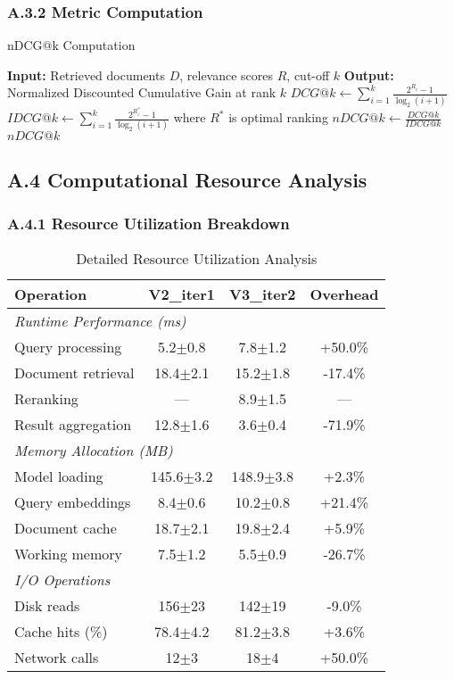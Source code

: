 \documentclass{article}
\begin{document}
\subsubsection{A.3.2 Metric Computation}
\begin{algorithm}
\caption{nDCG@k Computation}
\begin{algorithmic}[1]
\STATE \textbf{Input:} Retrieved documents $D$, relevance scores $R$, cut-off $k$
\STATE \textbf{Output:} Normalized Discounted Cumulative Gain at rank $k$
\STATE $DCG@k \leftarrow \sum_{i=1}^{k} \frac{2^{R_i} - 1}{\log_2(i + 1)}$
\STATE $IDCG@k \leftarrow \sum_{i=1}^{k} \frac{2^{R^*_i} - 1}{\log_2(i + 1)}$ where $R^*$ is optimal ranking
\STATE $nDCG@k \leftarrow \frac{DCG@k}{IDCG@k}$
\RETURN $nDCG@k$
\end{algorithmic}
\end{algorithm}

\subsection{A.4 Computational Resource Analysis}

\subsubsection{A.4.1 Resource Utilization Breakdown}
\begin{table}[h]
\centering
\caption{Detailed Resource Utilization Analysis}
\begin{tabular}{@{}lccc@{}}
\toprule
\textbf{Operation} & \textbf{V2\_iter1} & \textbf{V3\_iter2} & \textbf{Overhead} \\
\midrule
\multicolumn{4}{l}{\textit{Runtime Performance (ms)}} \\
Query processing & 5.2$\pm$0.8 & 7.8$\pm$1.2 & +50.0\% \\
Document retrieval & 18.4$\pm$2.1 & 15.2$\pm$1.8 & -17.4\% \\
Reranking & --- & 8.9$\pm$1.5 & --- \\
Result aggregation & 12.8$\pm$1.6 & 3.6$\pm$0.4 & -71.9\% \\
\midrule
\multicolumn{4}{l}{\textit{Memory Allocation (MB)}} \\
Model loading & 145.6$\pm$3.2 & 148.9$\pm$3.8 & +2.3\% \\
Query embeddings & 8.4$\pm$0.6 & 10.2$\pm$0.8 & +21.4\% \\
Document cache & 18.7$\pm$2.1 & 19.8$\pm$2.4 & +5.9\% \\
Working memory & 7.5$\pm$1.2 & 5.5$\pm$0.9 & -26.7\% \\
\midrule
\multicolumn{4}{l}{\textit{I/O Operations}} \\
Disk reads & 156$\pm$23 & 142$\pm$19 & -9.0\% \\
Cache hits (\%) & 78.4$\pm$4.2 & 81.2$\pm$3.8 & +3.6\% \\
Network calls & 12$\pm$3 & 18$\pm$4 & +50.0\% \\
\bottomrule
\end{tabular}
\end{table}
\end{document}

